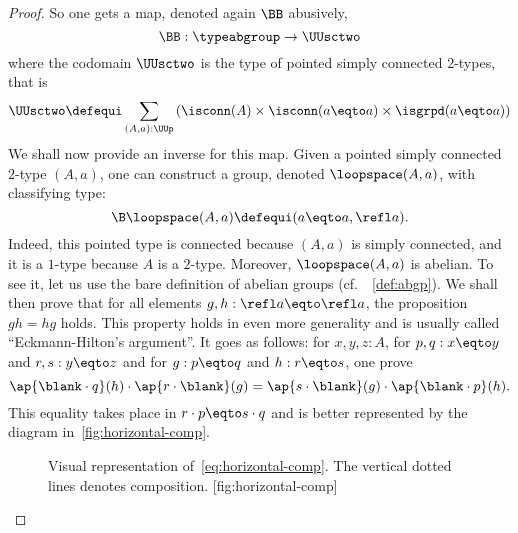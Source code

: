 \begin{proof}
  So one gets a map, denoted again $\BB$ abusively,
  \begin{displaymath}
    \BB : \typeabgroup \to \UUsctwo
  \end{displaymath}
  where the codomain $\UUsctwo$ is the type of pointed simply
  connected $2$-types, that is
  \begin{displaymath}
    \UUsctwo \defequi \sum_{(A,a):\UUp}\left(
      \isconn(A) \times \isconn(a\eqto a) \times \isgrpd(a\eqto a)
    \right)
  \end{displaymath}
  We shall now provide an inverse for this map. Given a pointed simply
  connected $2$-type $(A,a)$, one can construct a group, denoted
  $\loopspace (A,a)$, with classifying type:
  \begin{displaymath}
    \B\loopspace (A,a) \defequi (a\eqto a,\refl a).
  \end{displaymath}
  Indeed, this pointed type is connected because $(A,a)$ is simply
  connected, and it is a $1$-type because $A$ is a $2$-type. Moreover,
  $\loopspace (A,a)$ is abelian. To see it, let us use the bare
  definition of abelian groups (cf.\ ~\cref{def:abgp}). We shall then
  prove that for all elements $g,h:\refl a \eqto \refl a$, the
  proposition $gh=hg$ holds. This property holds in even more
  generality and is usually called ``Eckmann-Hilton's argument''. It
  goes as follows: for $x,y,z:A$, for $p,q:x\eqto y$ and
  $r,s:y \eqto z$ and for $g:p\eqto q$ and $h:r\eqto s$, one prove
  \begin{equation}
    \label{eq:horizontal-comp}%
    \ap{\blank\cdot q}(h) \cdot \ap{r\cdot\blank}(g)
    = \ap{s\cdot \blank}(g) \cdot \ap{\blank\cdot p}(h).
  \end{equation}
  This equality takes place in $r\cdot p \eqto s\cdot q$ and is better
  represented by the diagram in~\cref{fig:horizontal-comp}.
  \begin{figure}[h]
    \begin{sidecaption}
      {%
        Visual representation of~\cref{eq:horizontal-comp}. The vertical
        dotted lines denotes composition.%
      }[fig:horizontal-comp]
      \centering%
\end{sidecaption}
\end{figure}
\end{proof}
